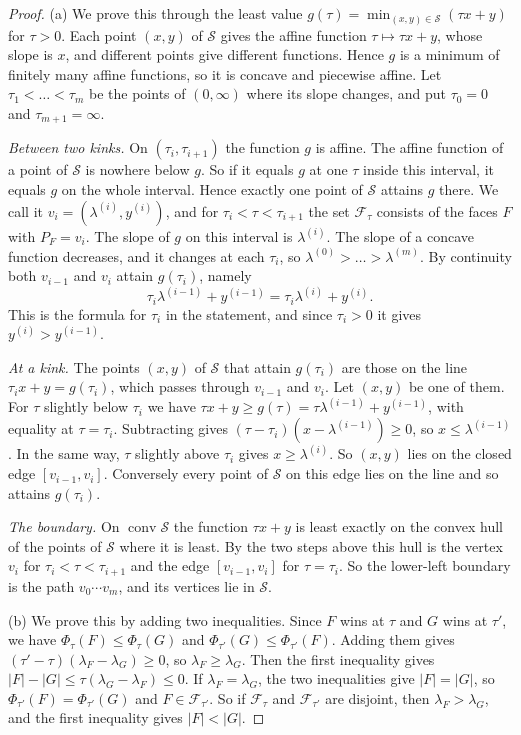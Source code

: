 \begin{proof}
(a) We prove this through the least value $g(\tau)=\min_{(x,y)\in\mathcal S}(\tau x+y)$ for $\tau>0$. Each point
$(x,y)$ of $\mathcal S$ gives the affine function $\tau\mapsto\tau x+y$, whose slope is $x$, and different
points give different functions. Hence $g$ is a minimum of finitely many affine functions, so it is
concave and piecewise affine. Let $\tau_1<\dots<\tau_m$ be the points of $(0,\infty)$ where its
slope changes, and put $\tau_0=0$ and $\tau_{m+1}=\infty$.

\emph{Between two kinks.} On $(\tau_i,\tau_{i+1})$ the function $g$ is affine. The affine
function of a point of $\mathcal S$ is nowhere below $g$. So if it equals $g$ at one $\tau$ inside this
interval, it equals $g$ on the whole interval. Hence exactly one point of $\mathcal S$ attains $g$ there.
We call it $v_i=(\lambda^{(i)},y^{(i)})$, and for $\tau_i<\tau<\tau_{i+1}$ the set
$\mathcal F_\tau$ consists of the faces $F$ with $P_F=v_i$. The slope of $g$ on this interval is
$\lambda^{(i)}$. The slope of a concave function decreases, and it changes at each $\tau_i$, so
$\lambda^{(0)}>\dots>\lambda^{(m)}$. By continuity both $v_{i-1}$ and $v_i$ attain $g(\tau_i)$,
namely
\[
\tau_i\lambda^{(i-1)}+y^{(i-1)}=\tau_i\lambda^{(i)}+y^{(i)} .
\]
This is the formula for $\tau_i$ in the statement, and since $\tau_i>0$ it gives
$y^{(i)}>y^{(i-1)}$.

\emph{At a kink.} The points $(x,y)$ of $\mathcal S$ that attain $g(\tau_i)$ are those on the line
$\tau_ix+y=g(\tau_i)$, which passes through $v_{i-1}$ and $v_i$. Let $(x,y)$ be one of them. For
$\tau$ slightly below $\tau_i$ we have $\tau x+y\ge g(\tau)=\tau\lambda^{(i-1)}+y^{(i-1)}$, with
equality at $\tau=\tau_i$. Subtracting gives $(\tau-\tau_i)(x-\lambda^{(i-1)})\ge0$, so
$x\le\lambda^{(i-1)}$. In the same way, $\tau$ slightly above $\tau_i$ gives
$x\ge\lambda^{(i)}$. So $(x,y)$ lies on the closed edge $[v_{i-1},v_i]$. Conversely every point of
$\mathcal S$ on this edge lies on the line and so attains $g(\tau_i)$.

\emph{The boundary.} On $\operatorname{conv}\mathcal S$ the function $\tau x+y$ is least exactly on the
convex hull of the points of $\mathcal S$ where it is least. By the two steps above this hull is the
vertex $v_i$ for $\tau_i<\tau<\tau_{i+1}$ and the edge $[v_{i-1},v_i]$ for $\tau=\tau_i$. So the
lower-left boundary is the path $v_0\cdots v_m$, and its vertices lie in $\mathcal S$.

(b) We prove this by adding two inequalities. Since $F$ wins at $\tau$ and $G$ wins at $\tau'$, we have
$\Phi_\tau(F)\le\Phi_\tau(G)$ and $\Phi_{\tau'}(G)\le\Phi_{\tau'}(F)$. Adding them gives
$(\tau'-\tau)(\lambda_F-\lambda_G)\ge0$, so $\lambda_F\ge\lambda_G$. Then the first inequality
gives $\lvert F\rvert-\lvert G\rvert\le\tau(\lambda_G-\lambda_F)\le0$. If
$\lambda_F=\lambda_G$, the two inequalities give $\lvert F\rvert=\lvert G\rvert$, so
$\Phi_{\tau'}(F)=\Phi_{\tau'}(G)$ and $F\in\mathcal F_{\tau'}$. So if $\mathcal F_\tau$ and
$\mathcal F_{\tau'}$ are disjoint, then $\lambda_F>\lambda_G$, and the first inequality gives
$\lvert F\rvert<\lvert G\rvert$.


\end{proof}
